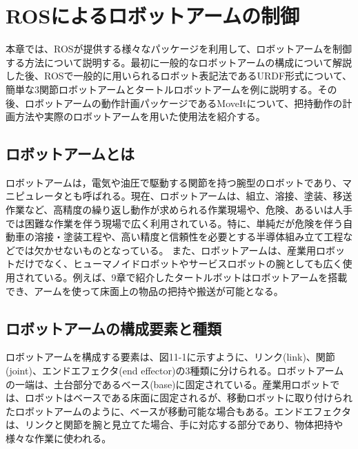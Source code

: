 
\chapter{ROSによるロボットアームの制御}

本章では、ROSが提供する様々なパッケージを利用して、ロボットアームを制御する方法について説明する。最初に一般的なロボットアームの構成について解説した後、ROSで一般的に用いられるロボット表記法であるURDF形式について、簡単な3関節ロボットアームとタートルロボットアームを例に説明する。その後、ロボットアームの動作計画パッケージであるMoveItについて、把持動作の計画方法や実際のロボットアームを用いた使用法を紹介する。

\section{ロボットアームとは}

ロボットアームは，電気や油圧で駆動する関節を持つ腕型のロボットであり、マニピュレータとも呼ばれる。現在、ロボットアームは、組立、溶接、塗装、移送作業など、高精度の繰り返し動作が求められる作業現場や、危険、あるいは人手では困難な作業を伴う現場で広く利用されている。特に、単純だが危険を伴う自動車の溶接・塗装工程や、高い精度と信頼性を必要とする半導体組み立て工程などでは欠かせないものとなっている。
また、ロボットアームは、産業用ロボットだけでなく、ヒューマノイドロボットやサービスロボットの腕としても広く使用されている。例えば、9章で紹介したタートルボットはロボットアームを搭載でき、アームを使って床面上の物品の把持や搬送が可能となる。

\section{ロボットアームの構成要素と種類}

ロボットアームを構成する要素は、図11-1に示すように、リンク(link)、関節(joint)、エンドエフェクタ(end effector)の3種類に分けられる。ロボットアームの一端は、土台部分であるベース(base)に固定されている。産業用ロボットでは、ロボットはベースである床面に固定されるが、移動ロボットに取り付けられたロボットアームのように、ベースが移動可能な場合もある。エンドエフェクタは、リンクと関節を腕と見立てた場合、手に対応する部分であり、物体把持や様々な作業に使われる。



